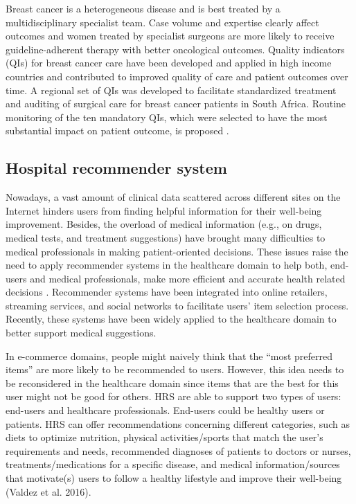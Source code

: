 Breast cancer is a heterogeneous disease and is best treated by a multidisciplinary specialist team. Case volume and expertise clearly affect outcomes and women treated by specialist surgeons are more likely to receive guideline-adherent therapy with better oncological outcomes. Quality indicators (QIs) for breast cancer care have been developed and applied in high income countries and contributed to improved quality of care and patient outcomes over time. A regional set of QIs was developed to facilitate standardized treatment and auditing of surgical care for breast cancer patients in South Africa. Routine monitoring of the ten mandatory QIs, which were selected to have the most substantial impact on patient outcome, is proposed \cite{nietz_quality_2020}.

\subsection{Hospital recommender system}

Nowadays, a vast amount of clinical data scattered across different sites on the Internet hinders users from finding helpful information for their well-being improvement. Besides, the overload of medical information (e.g., on drugs, medical tests, and treatment suggestions) have brought many difficulties to medical professionals in making patient-oriented decisions. These issues raise the need to apply recommender systems in the healthcare domain to help both, end-users and medical professionals, make more efficient and accurate health related decisions \cite{tran_recommender_2021}. Recommender systems have been integrated into online retailers, streaming services, and social networks to facilitate users' item selection process. Recently, these systems have been widely applied to the healthcare domain to better support medical suggestions.

In e-commerce domains, people might naively think that the ``most preferred items'' are more likely to be recommended to users. However, this idea needs to be reconsidered in the healthcare domain since items that are the best for this user might not be good for others. HRS are able to support two types of users: end-users and healthcare professionals. End-users could be healthy users or patients. HRS can offer recommendations concerning different categories, such as diets to optimize nutrition, physical activities/sports that match the user's requirements and needs, recommended diagnoses of patients to doctors or nurses, treatments/medications for a specific disease, and medical information/sources that motivate(s) users to follow a healthy lifestyle and improve their well-being (Valdez et al. 2016).

